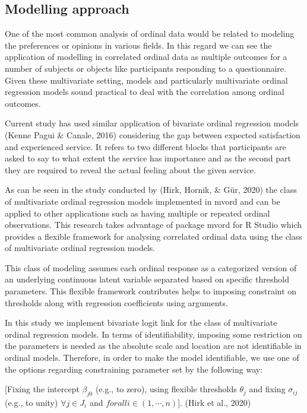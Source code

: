 \documentclass[
11pt, %
oneside, %
english, %
singlespacing, %
]{macthesis} %
\begin{document}
\hypertarget{modelling-approach}{%
\subsection{Modelling approach}\label{modelling-approach}}

One of the most common analysis of ordinal data would be related to modeling the preferences or opinions in various fields. In this regard we can see the application of modelling in correlated ordinal data as multiple outcomes for a number of subjects or objects like participants responding to a questionnaire. Given these multivariate setting, models and particularly multivariate ordinal regression models sound practical to deal with the correlation among ordinal outcomes.

Current study has used similar application of bivariate ordinal regression models (Kenne Pagui \& Canale, 2016) considering the gap between expected satisfaction and experienced service. It refers to two different blocks that participants are asked to say to what extent the service has importance and as the second part they are required to reveal the actual feeling about the given service.

As can be seen in the study conducted by (Hirk, Hornik, \& Gür, 2020) the class of multivariate ordinal regression models implemented in mvord and can be applied to other applications such as having multiple or repeated ordinal observations. This research takes advantage of package mvord for R Studio which provides a flexible framework for analysing correlated ordinal data using the class of multivariate ordinal regression models.

This class of modeling assumes each ordinal response as a categorized version of an underlying continuous latent variable separated based on specific threshold parameters. This flexible framework contributes helps to imposing constraint on thresholds along with regression coefficients using arguments.

In this study we implement bivariate logit link for the class of multivariate ordinal regression models. In terms of identifiability, imposing some restriction on the parameters is needed as the absolute scale and location are not identifiable in ordinal models. Therefore, in order to make the model identifiable, we use one of the options regarding constraining parameter set by the following way:

{[}Fixing the intercept \(\beta_{j0}\) (e.g., to zero), using flexible thresholds \(\theta_j\) and fixing \(\sigma_{ij}\) (e.g., to unity) \(\forall j \in J_i\) and \(forall i \in (1, \cdots, n)\){]}.
(Hirk et al., 2020)
\end{document}
